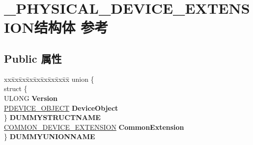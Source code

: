 \hypertarget{struct___p_h_y_s_i_c_a_l___d_e_v_i_c_e___e_x_t_e_n_s_i_o_n}{}\section{\+\_\+\+P\+H\+Y\+S\+I\+C\+A\+L\+\_\+\+D\+E\+V\+I\+C\+E\+\_\+\+E\+X\+T\+E\+N\+S\+I\+O\+N结构体 参考}
\label{struct___p_h_y_s_i_c_a_l___d_e_v_i_c_e___e_x_t_e_n_s_i_o_n}
\subsection*{Public 属性}
\begin{DoxyCompactItemize}
\item 
\mbox{\label{struct___p_h_y_s_i_c_a_l___d_e_v_i_c_e___e_x_t_e_n_s_i_o_n_a162560feafad9a86567c74f04ebbdfe5}} 
\begin{tabbing}
xx\=xx\=xx\=xx\=xx\=xx\=xx\=xx\=xx\=\kill
union \{\\
\>struct \{\\
\>\>ULONG {\bfseries Version}\\
\>\>\hyperlink{struct___d_e_v_i_c_e___o_b_j_e_c_t}{PDEVICE\_OBJECT} {\bfseries DeviceObject}\\
\>\} {\bfseries DUMMYSTRUCTNAME}\\
\>\hyperlink{struct_c_o_m_m_o_n___d_e_v_i_c_e___e_x_t_e_n_s_i_o_n}{COMMON\_DEVICE\_EXTENSION} {\bfseries CommonExtension}\\
\} {\bfseries DUMMYUNIONNAME}\\


\end{tabbing}
\end{DoxyCompactItemize}
